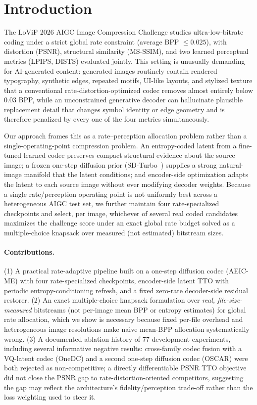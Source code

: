 \documentclass[runningheads]{llncs}
\begin{document}
\section{Introduction}
The LoViF 2026 AIGC Image Compression Challenge studies ultra-low-bitrate coding under a strict global rate constraint (average BPP $\leq 0.025$), with distortion (PSNR), structural similarity (MS-SSIM), and two learned perceptual metrics (LPIPS, DISTS) evaluated jointly. This setting is unusually demanding for AI-generated content: generated images routinely contain rendered typography, synthetic edges, repeated motifs, UI-like layouts, and stylized texture that a conventional rate-distortion-optimized codec removes almost entirely below 0.03 BPP, while an unconstrained generative decoder can hallucinate plausible replacement detail that changes symbol identity or edge geometry and is therefore penalized by every one of the four metrics simultaneously.

Our approach frames this as a rate--perception allocation problem rather than a single-operating-point compression problem. An entropy-coded latent from a fine-tuned learned codec preserves compact structural evidence about the source image; a frozen one-step diffusion prior (SD-Turbo~\cite{sauer2023sdturbo}) supplies a strong natural-image manifold that the latent conditions; and encoder-side optimization adapts the latent to each source image without ever modifying decoder weights. Because a single rate/perception operating point is not uniformly best across a heterogeneous AIGC test set, we further maintain four rate-specialized checkpoints and select, per image, whichever of several real coded candidates maximizes the challenge score under an exact global rate budget solved as a multiple-choice knapsack over measured (not estimated) bitstream sizes.

\paragraph{Contributions.} (1) A practical rate-adaptive pipeline built on a one-step diffusion codec (AEIC-ME) with four rate-specialized checkpoints, encoder-side latent TTO with periodic entropy-conditioning refresh, and a fixed zero-rate decoder-side residual restorer. (2) An exact multiple-choice knapsack formulation over \emph{real, file-size-measured} bitstreams (not per-image mean BPP or entropy estimates) for global rate allocation, which we show is necessary because fixed per-file overhead and heterogeneous image resolutions make naive mean-BPP allocation systematically wrong. (3) A documented ablation history of 77 development experiments, including several informative negative results: cross-family codec fusion with a VQ-latent codec (OneDC) and a second one-step diffusion codec (OSCAR) were both rejected as non-competitive; a directly differentiable PSNR TTO objective did not close the PSNR gap to rate-distortion-oriented competitors, suggesting the gap may reflect the architecture's fidelity/perception trade-off rather than the loss weighting used to steer it.
\end{document}
